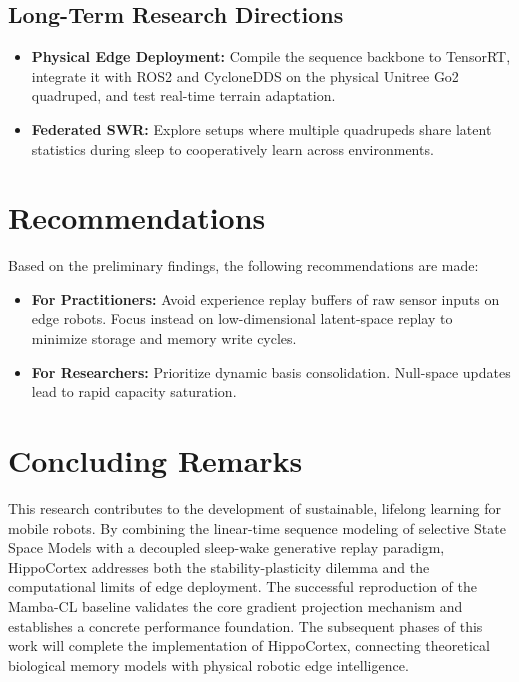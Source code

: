 \subsection{Long-Term Research Directions}
\label{subsec:long_term}
\begin{itemize}
    \item \textbf{Physical Edge Deployment:} Compile the sequence backbone to TensorRT, integrate it with ROS2 and CycloneDDS on the physical Unitree Go2 quadruped, and test real-time terrain adaptation.
    \item \textbf{Federated SWR:} Explore setups where multiple quadrupeds share latent statistics during sleep to cooperatively learn across environments.
\end{itemize}

\section{Recommendations}
\label{sec:recommendations}

Based on the preliminary findings, the following recommendations are made:
\begin{itemize}
    \item \textbf{For Practitioners:} Avoid experience replay buffers of raw sensor inputs on edge robots. Focus instead on low-dimensional latent-space replay to minimize storage and memory write cycles.
    \item \textbf{For Researchers:} Prioritize dynamic basis consolidation. Null-space updates lead to rapid capacity saturation.
\end{itemize}

\section{Concluding Remarks}
\label{sec:concluding_remarks}

This research contributes to the development of sustainable, lifelong learning for mobile robots. By combining the linear-time sequence modeling of selective State Space Models with a decoupled sleep-wake generative replay paradigm, HippoCortex addresses both the stability-plasticity dilemma and the computational limits of edge deployment. The successful reproduction of the Mamba-CL baseline validates the core gradient projection mechanism and establishes a concrete performance foundation. The subsequent phases of this work will complete the implementation of HippoCortex, connecting theoretical biological memory models with physical robotic edge intelligence.